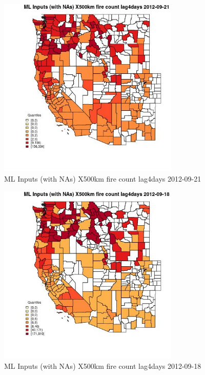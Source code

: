 \begin{figure} 
\centering  
\includegraphics[width=0.77\textwidth]{Code_Outputs/Report_ML_input_PM25_Step4_part_e_de_duplicated_aves_compiled_2019-05-14wNAs_CountyX500km_fire_count_lag4daysMean2012-09-21_2012-09-21.jpg} 
\caption{\label{fig:Report_ML_input_PM25_Step4_part_e_de_duplicated_aves_compiled_2019-05-14wNAsCountyX500km_fire_count_lag4daysMean2012-09-21_2012-09-21}ML Inputs (with NAs) X500km fire count lag4days 2012-09-21} 
\end{figure} 
 

\begin{figure} 
\centering  
\includegraphics[width=0.77\textwidth]{Code_Outputs/Report_ML_input_PM25_Step4_part_e_de_duplicated_aves_compiled_2019-05-14wNAs_CountyX500km_fire_count_lag4daysMean2012-09-18_2012-09-18.jpg} 
\caption{\label{fig:Report_ML_input_PM25_Step4_part_e_de_duplicated_aves_compiled_2019-05-14wNAsCountyX500km_fire_count_lag4daysMean2012-09-18_2012-09-18}ML Inputs (with NAs) X500km fire count lag4days 2012-09-18} 
\end{figure} 
 

